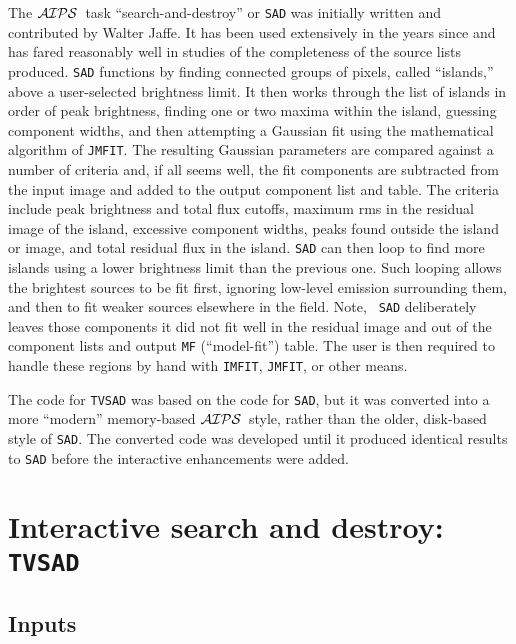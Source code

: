 \documentclass[twoside]{article}
\newcommand{\AIPS}{{$\cal AIPS\/$}}
\begin{document}
The \AIPS\ task ``search-and-destroy'' or {\tt SAD} was initially
written and contributed by Walter Jaffe.  It has been used extensively
in the years since and has fared reasonably well in studies of the
completeness of the source lists produced.  {\tt SAD} functions by
finding connected groups of pixels, called ``islands,'' above a
user-selected brightness limit.  It then works through the list of
islands in order of peak brightness, finding one or two maxima within
the island, guessing component widths, and then attempting a Gaussian
fit using the mathematical algorithm of {\tt JMFIT}\@.  The resulting
Gaussian parameters are compared against a number of criteria and, if
all seems well, the fit components are subtracted from the input image
and added to the output component list and table.  The criteria
include peak brightness and total flux cutoffs, maximum rms in the
residual image of the island, excessive component widths, peaks found
outside the island or image, and total residual flux in the island.
{\tt SAD} can then loop to find more islands using a lower brightness
limit than the previous one.  Such looping allows the brightest
sources to be fit first, ignoring low-level emission surrounding them,
and then to fit weaker sources elsewhere in the field.  Note, {\tt
  SAD} deliberately leaves those components it did not fit well in the
residual image and out of the component lists and output {\tt MF}
(``model-fit'') table.  The user is then required to handle these
regions by hand with {\tt IMFIT}, {\tt JMFIT}, or other means.

The code for {\tt TVSAD} was based on the code for {\tt SAD}, but it
was converted into a more ``modern'' memory-based \AIPS\ style, rather
than the older, disk-based style of {\tt SAD}\@.  The converted code
was developed until it produced identical results to {\tt SAD} before
the interactive enhancements were added.

\section{Interactive search and destroy: {\tt TVSAD}}

\subsection{Inputs}
\end{document}
